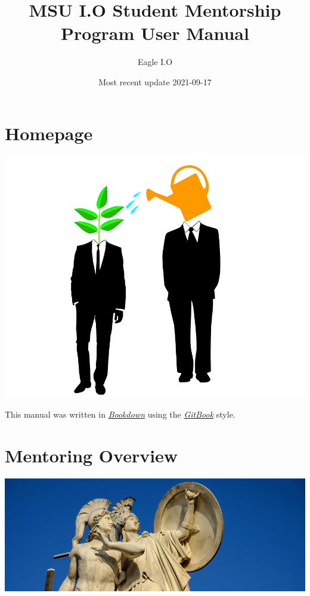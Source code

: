 \documentclass[
  openany]{book}
\title{MSU I.O Student Mentorship Program User Manual}
\author{Eagle I.O}
\date{Most recent update 2021-09-17}
\begin{document}
\maketitle

{
\setcounter{tocdepth}{1}
\tableofcontents
}
\hypertarget{Homepage}{%
\chapter*{Homepage}\label{Homepage}}

\includegraphics{images/cover.png}

This manual was written in \href{https://bookdown.org/}{\emph{Bookdown}} using the \href{https://bookdown.org/yihui/bookdown/html.html}{\emph{GitBook}} style.

\hypertarget{mentoring-overview}{%
\chapter{Mentoring Overview}\label{mentoring-overview}}

\includegraphics{images/greek.jpg}
\end{document}
